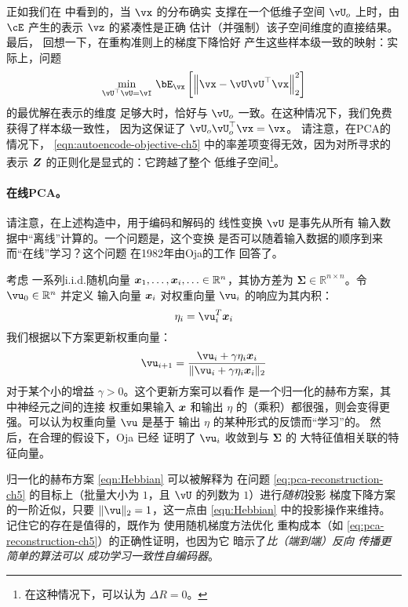\documentclass[../../book-main_zh.tex]{subfiles}
\begin{document}
正如我们在  中看到的，当 $\vx$ 的分布确实
支撑在一个低维子空间 $\vU_o$ 上时，由 $\cE$ 产生的表示
$\vz$ 的紧凑性是正确
估计（并强制）该子空间维度的直接结果。最后，
回想一下，在重构准则上的梯度下降恰好
产生这些样本级一致的映射：实际上，问题
\begin{equation}\label{eq:pca-reconstruction-ch5}
  \min_{\vU^\top \vU = \vI}\, \bE_{\vx}\left[\norm*{\vx
  - \vU\vU^\top \vx}_2^2\right]
\end{equation}
的最优解在表示的维度
足够大时，恰好与 $\vU_o$ 一致。在这种情况下，我们免费获得了样本级一致性，
因为这保证了 $\vU_o\vU_o^\top \vx = \vx$。
请注意，在PCA的情况下，
\eqref{eqn:autoencode-objective-ch5} 中的率差项变得无效，因为对所寻求的表示 $\bm{Z}$ 的正则化是显式的：它跨越了整个
低维子空间\footnote{在这种情况下，可以认为 $\Delta R = 0$。}。

\paragraph{在线PCA。} 请注意，在上述构造中，用于编码和解码的
线性变换 $\vU$ 是事先从所有
输入数据中“离线”计算的。一个问题是，这个变换
是否可以随着输入数据的顺序到来而“在线”学习？这个问题
在1982年由Oja的工作 \cite{Oja1982SimplifiedNM} 回答了。
\begin{example}[PCA的归一化赫布学习方案] 考虑
  一系列i.i.d.随机向量 $\bm{x}_1, \ldots, \bm{x}_i, \ldots \in
  \mathbb{R}^n$，其协方差为 $\boldsymbol{\Sigma} \in
  \mathbb{R}^{n\times n}$。令 $\vu_0 \in \mathbb{R}^n$ 并定义
  输入向量 $\bm{x}_i$ 对权重向量
  $\vu_i$ 的响应为其内积：
  \begin{equation}
    \eta_i = \vu_i^T \x_i
  \end{equation}
  我们根据以下方案更新权重向量：
  \begin{equation}
    \vu_{i+1} = \frac{\vu_i + \gamma \eta_i \x_i}{\|\vu_i + \gamma
    \eta_i \x_i\|_2}
    \label{eqn:Hebbian}
  \end{equation}
  对于某个小的增益 $\gamma >0$。这个更新方案可以看作
  是一个归一化的赫布方案，其中神经元之间的连接
  权重如果输入 $\bm{x}$ 和输出 $\eta$ 的（乘积）都很强，则会变得更强。可以认为权重向量
  $\vu$ 是基于
  输出 $\eta$ 的某种形式的反馈而“学习”的。
  然后，在合理的假设下，Oja \cite{Oja1982SimplifiedNM} 已经
  证明了 $\vu_i$ 收敛到与 $\boldsymbol{\Sigma}$ 的
  大特征值相关联的特征向量。
\end{example}

归一化的赫布方案 \eqref{eqn:Hebbian} 可以被解释为
在问题 \eqref{eq:pca-reconstruction-ch5} 的目标上（批量大小为
$1$，且 $\vU$ 的列数为 $1$）进行\textit{随机}投影
梯度下降方案的一阶近似，只要
$\norm{\vu}_2 = 1$，这一点由
\eqref{eqn:Hebbian} 中的投影操作来维持。
记住它的存在是值得的，既作为
使用随机梯度方法优化
重构成本（如 \eqref{eq:pca-reconstruction-ch5}）的正确性证明，也因为它
暗示了\textit{比（端到端）反向
  传播更简单的算法可以
成功学习一致性自编码器}。
\end{document}
